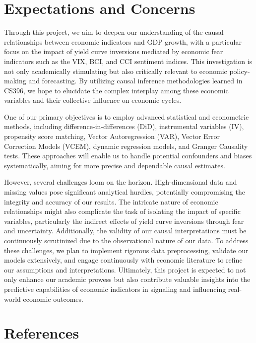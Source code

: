\documentclass[11pt]{article}
\begin{document}
\section{Expectations and Concerns}

Through this project, we aim to deepen our understanding of the causal relationships between economic indicators and GDP growth, with a particular focus on the impact of yield curve inversions mediated by economic fear indicators such as the VIX, BCI, and CCI sentiment indices. This investigation is not only academically stimulating but also critically relevant to economic policy-making and forecasting. By utilizing causal inference methodologies learned in CS396, we hope to elucidate the complex interplay among these economic variables and their collective influence on economic cycles.

One of our primary objectives is to employ advanced statistical and econometric methods, including difference-in-differences (DiD), instrumental variables (IV), propensity score matching, Vector Autoregression (VAR), Vector Error Correction Models (VCEM), dynamic regression models, and Granger Causality tests. These approaches will enable us to handle potential confounders and biases systematically, aiming for more precise and dependable causal estimates.

However, several challenges loom on the horizon. High-dimensional data and missing values pose significant analytical hurdles, potentially compromising the integrity and accuracy of our results. The intricate nature of economic relationships might also complicate the task of isolating the impact of specific variables, particularly the indirect effects of yield curve inversions through fear and uncertainty. Additionally, the validity of our causal interpretations must be continuously scrutinized due to the observational nature of our data. To address these challenges, we plan to implement rigorous data preprocessing, validate our models extensively, and engage continuously with economic literature to refine our assumptions and interpretations. Ultimately, this project is expected to not only enhance our academic prowess but also contribute valuable insights into the predictive capabilities of economic indicators in signaling and influencing real-world economic outcomes.


\section{References}
\end{document}
